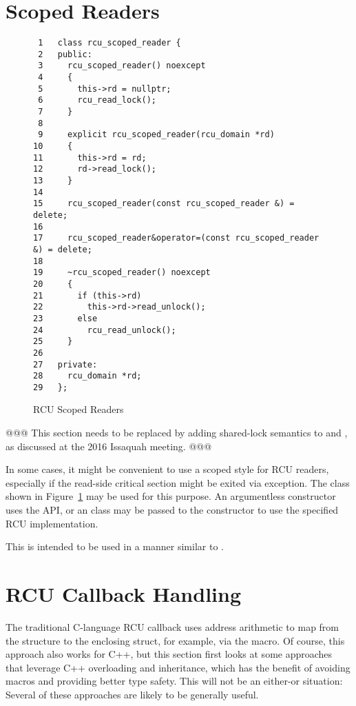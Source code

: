 \documentclass[letterpaper,twocolumn,10pt]{article}
\begin{document}
\section{Scoped Readers}
\label{sec:Scoped Readers}

\begin{figure}[tbp]
{ \scriptsize
\begin{verbatim}
 1   class rcu_scoped_reader {
 2   public:
 3     rcu_scoped_reader() noexcept
 4     {
 5       this->rd = nullptr;
 6       rcu_read_lock();
 7     }
 8
 9     explicit rcu_scoped_reader(rcu_domain *rd)
10     {
11       this->rd = rd;
12       rd->read_lock();
13     }
14
15     rcu_scoped_reader(const rcu_scoped_reader &) = delete;
16
17     rcu_scoped_reader&operator=(const rcu_scoped_reader &) = delete;
18
19     ~rcu_scoped_reader() noexcept
20     {
21       if (this->rd)
22         this->rd->read_unlock();
23       else
24         rcu_read_unlock();
25     }
26
27   private:
28     rcu_domain *rd;
29   };
\end{verbatim}
}
\caption{RCU Scoped Readers}
\label{fig:RCU Scoped Readers}
\end{figure}

@@@ This section needs to be replaced by adding shared-lock semantics
to  and , as discussed at
the 2016 Issaquah meeting. @@@

In some cases, it might be convenient to use a scoped style for RCU readers,
especially if the read-side critical section might be exited via exception.
The  class shown in
Figure~\ref{fig:RCU Scoped Readers}
may be used for this purpose.
An argumentless constructor uses the API, or an  class
may be passed to the constructor to use the specified RCU
implementation.

This is intended to be used in a manner similar to
.

\section{RCU Callback Handling}
\label{sec:RCU Callback Handling}

The traditional C-language RCU callback uses address arithmetic
to map from the  structure to the enclosing struct,
for example, via the  macro.
Of course, this approach also works for C++, but this section first
looks at some approaches that leverage C++ overloading and inheritance,
which has the benefit of avoiding macros and providing better type safety.
This will not be an either-or situation: Several of these approaches
are likely to be generally useful.
\end{document}
